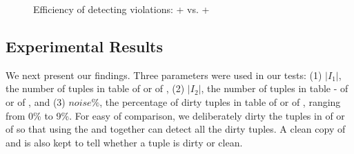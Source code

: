 \begin{figure}[tb!]
  \quad
  \quad
  \vspace{-2ex}
  \caption{Efficiency of detecting violations: \spCFDs + \spCINDs vs. \sCFDs + \sCINDs}\label{fig_exp1_both}
  \vspace{-3ex}
\end{figure}


\vspace{-1ex}
\subsection{Experimental Results}





We next present our findings.
%
Three parameters were used in our tests:
(1) $|I_1|$, the number of tuples in table  of \hosp or  of \dblp,
(2) $|I_2|$, the number of tuples in table - of \hosp or  of \dblp, and
(3) $noise\%$, the percentage of dirty tuples in table  of \hosp or   of \dblp, ranging from 0\% to 9\%.
For easy of comparison, we deliberately dirty the tuples in  of \hosp or   of \dblp so that using the \pCFDs and \pCINDs together can detect all the dirty tuples. A clean copy of \hosp and \dblp is also kept to tell whether a tuple is dirty or clean.


